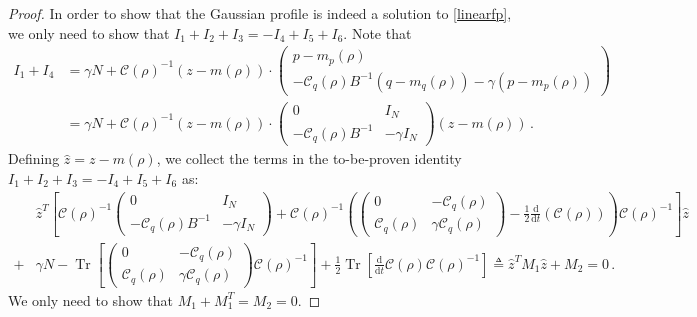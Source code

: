 \documentclass[12pt]{caltech_thesis}
\numberwithin{equation}{section}
\begin{document}
{\begin{proof}
In order to show that the Gaussian profile is indeed a solution to \eqref{linearfp}, we only need to show that $I_1+I_2+I_3=-I_4+I_5+I_6$. Note that \[\begin{aligned}I_1+I_4&={\gamma}N+{\mathcal{C}}(\rho)^{-1}(z-m(\rho)) \cdot \begin{pmatrix}
p-m_p(\rho) \\
-\mathcal{C}_q(\rho)B^{-1}(q-m_q(\rho)) - {\gamma}(p-m_p(\rho))
\end{pmatrix}\\&={\gamma}N+{\mathcal{C}}(\rho)^{-1}(z-m(\rho)) \cdot\begin{pmatrix}
0 &I_N \\
-\mathcal{C}_q(\rho)B^{-1} &- {\gamma}I_N
\end{pmatrix} (z-m(\rho))\,.\end{aligned}\]
Defining $\hat{z}=z-m(\rho)$, we collect the terms in the to-be-proven identity $I_1+I_2+I_3=-I_4+I_5+I_6$ as:
\[\begin{aligned}
&\hat{z}^T\left[{\mathcal{C}}(\rho)^{-1}\begin{pmatrix}
0 &I_N \\
-\mathcal{C}_q(\rho)B^{-1} &- {\gamma}I_N
\end{pmatrix}+{\mathcal{C}}(\rho)^{-1} \left(\begin{pmatrix}
0 & -\mathcal{C}_q(\rho) \\
\mathcal{C}_q(\rho) & {\gamma}\mathcal{C}_q(\rho)
\end{pmatrix}-\frac{1}{2}\frac{\mathrm{d}}{\mathrm{d} t}\left({\mathcal{C}}(\rho)\right)\right){\mathcal{C}}(\rho)^{-1}\right]\hat{z}\\+&{\gamma}N-\operatorname{Tr}\left[\begin{pmatrix}
0 & -\mathcal{C}_q(\rho) \\
\mathcal{C}_q(\rho) & {\gamma}\mathcal{C}_q(\rho)
\end{pmatrix}{\mathcal{C}}(\rho)^{-1}\right]+\frac{1}{2}\operatorname{Tr}\left[\frac{\mathrm{d}}{\mathrm{d} t} {\mathcal{C}}(\rho){\mathcal{C}}(\rho)^{-1} \right]\triangleq \hat{z}^T M_1\hat{z}+M_2=0\,.
\end{aligned}\]
We only need to show that $M_1+M_1^T=M_2=0$.


\end{proof}}
\end{document}
